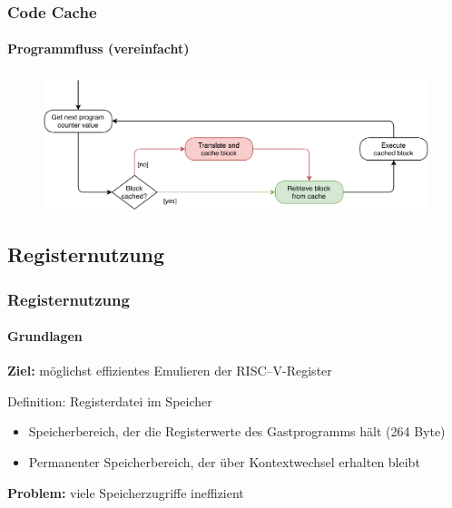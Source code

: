 \begin{frame}[c]
	\frametitle{Code Cache}
	\framesubtitle{Programmfluss (vereinfacht)}
	\centering
	\begin{figure}
		\includegraphics[width=\textwidth]{diagrams/cache-flow}
	\end{figure}
\end{frame}


\subsection{Registernutzung} %
\begin{frame}
	\frametitle{Registernutzung}
	\framesubtitle{Grundlagen}
	
	\textbf{Ziel:} möglichst effizientes Emulieren der RISC--V-Register
	
	\vspace{0.50cm}
	
	\begin{block}{Definition: Registerdatei im Speicher}
		\begin{itemize}
			\item Speicherbereich, der die Registerwerte des Gastprogramms hält (264 Byte)
			\item Permanenter Speicherbereich, der über Kontextwechsel erhalten bleibt
		\end{itemize}
	\end{block}
	
	\vspace{0.50cm}
	
	\textbf{Problem:} viele Speicherzugriffe \conclude \alert{ineffizient}
\end{frame}

